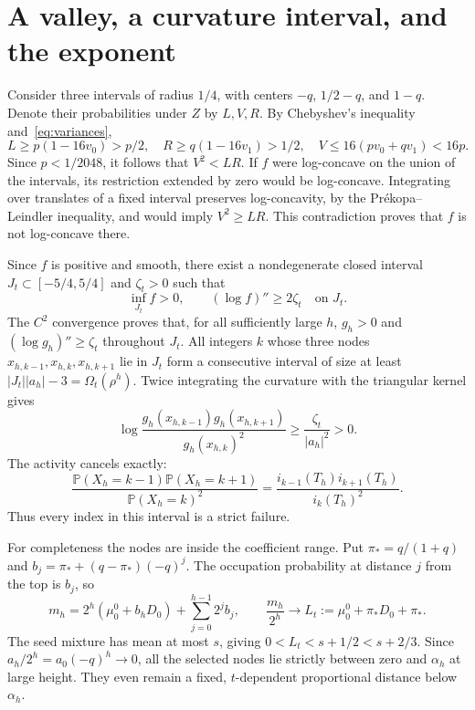 \documentclass[11pt]{article}
\newcommand{\Pp}{\mathbb P}
\begin{document}
\section{A valley, a curvature interval, and the exponent}
Consider three intervals of radius $1/4$, with centers $-q$, $1/2-q$,
and $1-q$. Denote their probabilities under $Z$ by $L,V,R$.
By Chebyshev's inequality and~\eqref{eq:variances},
\begin{equation}\label{eq:valley}
 L\ge p(1-16v_0)>p/2,\quad
 R\ge q(1-16v_1)>1/2,\quad
 V\le16(pv_0+qv_1)<16p.
\end{equation}
Since $p<1/2048$, it follows that $V^2<LR$.
If $f$ were log-concave on the union of the intervals, its restriction
extended by zero would be log-concave. Integrating over translates of
a fixed interval preserves log-concavity, by the Pr\'ekopa--Leindler
inequality, and would imply $V^2\ge LR$. This contradiction proves
that $f$ is not log-concave there.

Since $f$ is positive and smooth, there exist a nondegenerate closed
interval $J_t\subset[-5/4,5/4]$ and $\zeta_t>0$ such that
\begin{equation}\label{eq:J}
 \inf_{J_t}f>0,\qquad (\log f)''\ge2\zeta_t\quad\text{on }J_t.
\end{equation}
The $C^2$ convergence proves that, for all sufficiently large $h$,
$g_h>0$ and $(\log g_h)''\ge\zeta_t$ throughout $J_t$.
All integers $k$ whose three nodes $x_{h,k-1},x_{h,k},x_{h,k+1}$ lie
in $J_t$ form a consecutive interval of size at least
$|J_t||a_h|-3=\Omega_t(\rho^h)$.
Twice integrating the curvature with the triangular kernel gives
\[
 \log\frac{g_h(x_{h,k-1})g_h(x_{h,k+1})}{g_h(x_{h,k})^2}
 \ge\frac{\zeta_t}{|a_h|^2}>0.
\]
The activity cancels exactly:
\begin{equation}\label{eq:cancel}
 \frac{\Pp(X_h=k-1)\Pp(X_h=k+1)}{\Pp(X_h=k)^2}
 =\frac{i_{k-1}(T_h)i_{k+1}(T_h)}{i_k(T_h)^2}.
\end{equation}
Thus every index in this interval is a strict failure.

For completeness the nodes are inside the coefficient range. Put
$\pi_*=q/(1+q)$ and $b_j=\pi_*+(q-\pi_*)(-q)^j$.
The occupation probability at distance $j$ from the top is $b_j$, so
\begin{equation}\label{eq:mean}
 m_h=2^h(\mu_0^0+b_hD_0)+\sum_{j=0}^{h-1}2^jb_j,
 \qquad \frac{m_h}{2^h}\longrightarrow
 L_t:=\mu_0^0+\pi_*D_0+\pi_*.
\end{equation}
The seed mixture has mean at most $s$, giving
$0<L_t<s+1/2<s+2/3$. Since $a_h/2^h=a_0(-q)^h\to0$,
all the selected nodes lie strictly between zero and $\alpha_h$ at
large height. They even remain a fixed, $t$-dependent proportional
distance below $\alpha_h$.
\end{document}
